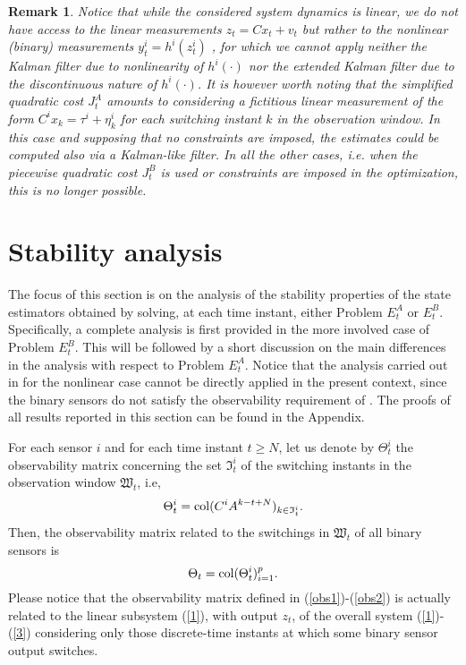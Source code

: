 \documentclass[11pt,journal,onecolumn]{IEEEtran}
\newtheorem{remark}{Remark}
\begin{document}
\begin{remark}
Notice that while the considered system dynamics is linear, we do not have access to the linear measurements $z_t = C x_t + v_t$ but rather to the nonlinear (binary) measurements $y_t^i = h^i(z_t^i)$ , for which we cannot apply neither the Kalman filter due to nonlinearity of $h^i(\cdot)$ nor the extended Kalman filter due to the discontinuous nature of $h^i(\cdot)$. It is however worth noting that the simplified quadratic cost $J^A_t$ amounts to considering  a {\em fictitious} linear measurement of the form $C^i x_{k} = \tau^i + \eta^i_k$ for each switching instant $k$ in the observation window. In this case and supposing that no constraints are imposed, the estimates could be computed also via a Kalman-like filter. In all the other cases, i.e. when the piecewise quadratic cost $J^B_t$ is used or constraints are imposed in the optimization, this is no longer possible.
\end{remark}

\section{Stability analysis}

The focus of this section is on the analysis of the stability properties of the state estimators obtained by solving, at each time instant, either Problem $E^A_t$ or $E^B_t$. Specifically, a complete analysis is first provided in the more involved case of Problem $E^B_t$. This will be followed by a short discussion on the main differences in the analysis with respect to Problem $E^A_t$. Notice that the analysis carried out in \cite{NLMHE} for the nonlinear case cannot be directly applied in the present context, since the binary sensors do not satisfy the observability requirement of \cite{NLMHE}. The proofs of all results reported in this section can be found in the Appendix.

For each sensor $i$ and for each time instant $t\geq N$, let us denote by $\Theta_{t}^{i}$ the observability matrix concerning the set $\mathfrak{I}_{t}^{i}$ of the switching instants in the observation window $\mathfrak{W}_t$, i.e,
\begin{equation}
\Theta_{t}^{i}={\rm col}(C^{i}A^{k-t+N})_{k\in\mathfrak{I}_{t}^{i}}.
\label{obs1}
\end{equation}
Then, the observability matrix related to the switchings in $\mathfrak{W}_t$ of all binary sensors is
\begin{equation}
\Theta_{t}={\rm col}(\Theta_{t}^{i})_{i=1}^{p}.
\label{obs2}
\end{equation}
Please notice that the observability matrix defined in (\ref{obs1})-(\ref{obs2}) is actually related to the linear subsystem (\ref{1}), with output $z_t$, of the overall system (\ref{1})-(\ref{3}) considering only those discrete-time instants at which some binary sensor output switches.
\end{document}
